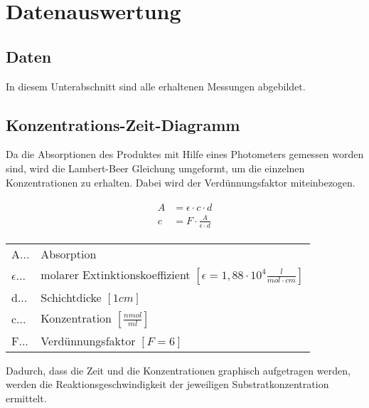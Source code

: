 \newpage
\section{Datenauswertung}

\subsection{Daten}

In diesem Unterabschnitt sind alle erhaltenen Messungen  abgebildet.






\subsection{Konzentrations-Zeit-Diagramm}

Da die Absorptionen des Produktes mit Hilfe eines Photometers gemessen worden sind, wird die Lambert-Beer Gleichung umgeformt, um die einzelnen Konzentrationen zu erhalten. Dabei wird der Verdünnungsfaktor miteinbezogen. 

\begin{align}
  \begin{split}  
    A &= \epsilon \cdot c \cdot d \\
    c &= F \cdot \frac{A}{\epsilon \cdot d}
  \end{split}
\end{align}

\begin{table}[H]
  \begin{tabular}{ll}
    A...& Absorption \\
    $\epsilon$... & molarer Extinktionskoeffizient $[\epsilon = 1,88 \cdot 10^4 \frac{l}{mol \cdot cm}]$ \\
    d... & Schichtdicke $[1cm]$ \\
    c... & Konzentration $[\frac{nmol}{ml}]$ \\
    F... & Verdünnungsfaktor $[F = 6]$
  \end{tabular}
\end{table}

Dadurch, dass die Zeit und die Konzentrationen graphisch aufgetragen werden, werden die Reaktionsgeschwindigkeit der jeweiligen Substratkonzentration ermittelt.


